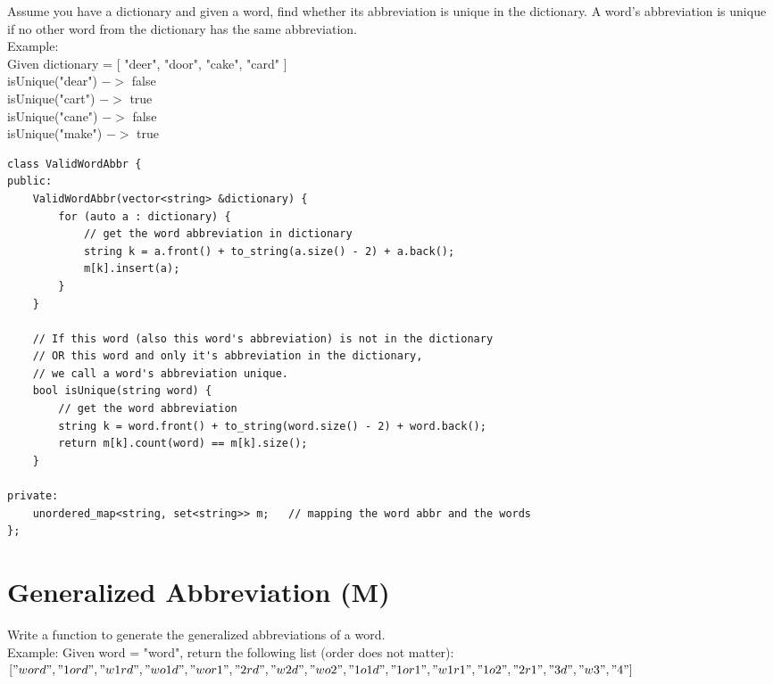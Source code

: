 Assume you have a dictionary and given a word, find whether its abbreviation is unique in the dictionary. A word's abbreviation is unique if no other word from the dictionary has the same abbreviation.\\

Example: \\
Given dictionary = [ "deer", "door", "cake", "card" ]\\
isUnique("dear") $->$ false\\
isUnique("cart") $->$ true\\
isUnique("cane") $->$ false\\
isUnique("make") $->$ true\\

\begin{lstlisting}
class ValidWordAbbr {
public:
    ValidWordAbbr(vector<string> &dictionary) {
        for (auto a : dictionary) {
            // get the word abbreviation in dictionary
            string k = a.front() + to_string(a.size() - 2) + a.back(); 
            m[k].insert(a);
        }
    }
    
    // If this word (also this word's abbreviation) is not in the dictionary 
    // OR this word and only it's abbreviation in the dictionary,
    // we call a word's abbreviation unique.
    bool isUnique(string word) {
        // get the word abbreviation
        string k = word.front() + to_string(word.size() - 2) + word.back();
        return m[k].count(word) == m[k].size();
    }
    
private:
    unordered_map<string, set<string>> m;   // mapping the word abbr and the words
};
\end{lstlisting}


\section{Generalized Abbreviation (M)}
Write a function to generate the generalized abbreviations of a word.\\

Example: Given word = "word", return the following list (order does not matter):\\
$["word", "1ord", "w1rd", "wo1d", "wor1", "2rd", "w2d", "wo2", "1o1d", "1or1", "w1r1", \\
"1o2", "2r1", "3d", "w3", "4"]$ \\

